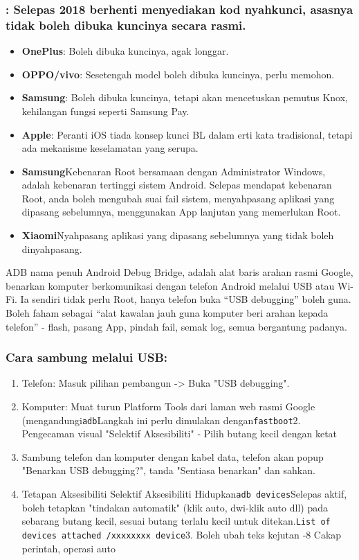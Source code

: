 \subsubsection*{: Selepas 2018 berhenti menyediakan kod nyahkunci, asasnya tidak boleh dibuka kuncinya secara rasmi.}

\begin{itemize}
  \item \textbf{OnePlus}: Boleh dibuka kuncinya, agak longgar.
  \item \textbf{OPPO/vivo}: Sesetengah model boleh dibuka kuncinya, perlu memohon.
  \item \textbf{Samsung}: Boleh dibuka kuncinya, tetapi akan mencetuskan pemutus Knox, kehilangan fungsi seperti Samsung Pay.
  \item \textbf{Apple}: Peranti iOS tiada konsep kunci BL dalam erti kata tradisional, tetapi ada mekanisme keselamatan yang serupa.
  \item \textbf{Samsung}Kebenaran Root bersamaan dengan Administrator Windows, adalah kebenaran tertinggi sistem Android. Selepas mendapat kebenaran Root, anda boleh mengubah suai fail sistem, menyahpasang aplikasi yang dipasang sebelumnya, menggunakan App lanjutan yang memerlukan Root.
  \item \textbf{Xiaomi}Nyahpasang aplikasi yang dipasang sebelumnya yang tidak boleh dinyahpasang.
\end{itemize}


ADB nama penuh Android Debug Bridge, adalah alat baris arahan rasmi Google, benarkan komputer berkomunikasi dengan telefon Android melalui USB atau Wi-Fi. Ia sendiri tidak perlu Root, hanya telefon buka “USB debugging” boleh guna. Boleh faham sebagai “alat kawalan jauh guna komputer beri arahan kepada telefon” - flash, pasang App, pindah fail, semak log, semua bergantung padanya.

\subsubsection*{Cara sambung melalui USB:}

\begin{enumerate}
  \item Telefon: Masuk pilihan pembangun -> Buka "USB debugging".
  \item Komputer: Muat turun Platform Tools dari laman web rasmi Google (mengandungi\texttt{adb}Langkah ini perlu dimulakan dengan\texttt{fastboot}2. Pengecaman visual "Selektif Aksesibiliti" ‑ Pilih butang kecil dengan ketat
  \item Sambung telefon dan komputer dengan kabel data, telefon akan popup "Benarkan USB debugging?", tanda "Sentiasa benarkan" dan sahkan.
  \item Tetapan Aksesibiliti Selektif Aksesibiliti Hidupkan\texttt{adb devices}Selepas aktif, boleh tetapkan "tindakan automatik" (klik auto, dwi-klik auto dll) pada sebarang butang kecil, sesuai butang terlalu kecil untuk ditekan.\texttt{List of devices attached /\allowbreak  xxxxxxxx device}3. Boleh ubah teks kejutan ‑8 Cakap perintah, operasi auto
\end{enumerate}

